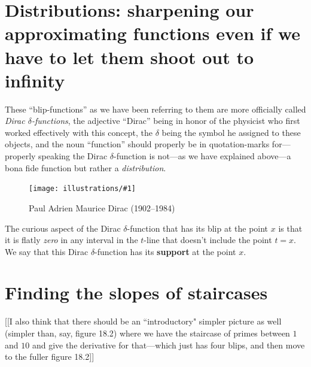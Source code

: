 \documentclass[11pt,draft]{article}
\newcommand{\ill}[3]{ 
   \begin{figure}[H]
   \begin{center}
   \texttt{[image: illustrations/\#1]}
   \caption{#3}
   \end{center}
    \end{figure}
}
\theoremstyle{plain}
\theoremstyle{definition}
\numberwithin{equation}{section}
\numberwithin{figure}{section}
\numberwithin{table}{section}
\begin{document}
\section{Distributions: sharpening our approximating functions even if
  we have to let them shoot out to infinity}
These ``blip-functions'' as we have been referring to them are more
officially called {\em Dirac $\delta$-functions}, the adjective
``Dirac'' being in honor of the physicist who first worked effectively
with this concept, the $\delta$ being the symbol he assigned to these
objects, and the noun ``function'' should properly be in
quotation-marks for---properly speaking the Dirac $\delta$-function is
not---as we have explained above---a bona fide function but rather a
{\em distribution}.

\ill{dirac}{0.2}{Paul Adrien Maurice Dirac (1902--1984)}

   The curious aspect of the Dirac $\delta$-function that has its blip
   at the point $x$ is that it is flatly {\em zero} in any interval in
   the $t$-line that doesn't include the point $t=x$.  We say that
   this Dirac $\delta$-function has its {\bf support} at the point $x$.


\section{Finding the slopes of staircases} 

[[I also think that there should be an ``introductory" simpler picture
as well (simpler than, say, figure 18.2) where we have the staircase
of primes between $1$ and $10$ and give the derivative for
that---which just has four blips, and then move to the fuller figure
18.2]]
\end{document}
